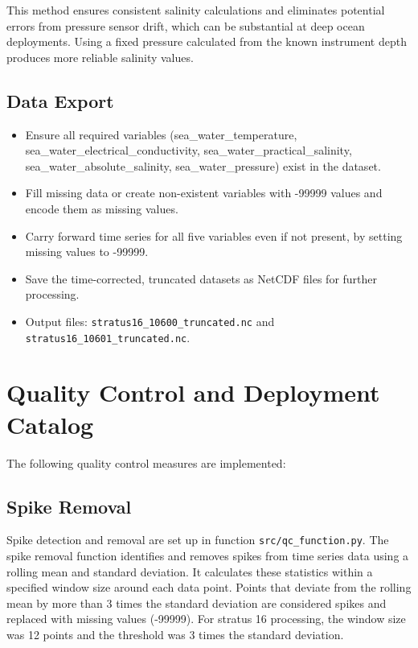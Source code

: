 \documentclass[11pt]{article}
\newcommand{\projectname}{stratus}  %
\newcommand{\casenumber}{16}  %
\newcommand{\FirstInstrument}{10600}
\newcommand{\SecondInstrument}{10601}
\newcommand{\WindowSize}{12}  %
\newcommand{\ThresholdValue}{3}  %
\begin{document}
This method ensures consistent salinity calculations and eliminates potential errors from pressure sensor drift, 
which can be substantial at deep ocean deployments. 
Using a fixed pressure calculated from the known instrument depth produces more reliable salinity values.

\subsection{Data Export}

\begin{itemize}
\item Ensure all required variables (sea\_water\_temperature, sea\_water\_electrical\_conductivity, sea\_water\_practical\_salinity, sea\_water\_absolute\_salinity, sea\_water\_pressure) exist in the dataset.
\item Fill missing data or create non-existent variables with -99999 values and encode them as missing values.
\item Carry forward time series for all five variables even if not present, by setting missing values to -99999.
\item Save the time-corrected, truncated datasets as NetCDF files for further processing.
\item Output files: 
\texttt{\projectname\casenumber\_\FirstInstrument\_truncated.nc}
and \texttt{\projectname\casenumber\_\SecondInstrument\_truncated.nc}.
\end{itemize}


\section{Quality Control and Deployment Catalog}
The following quality control measures are implemented:

\subsection{Spike Removal}
Spike detection and removal are set up in function \texttt{src/qc\_function.py}. 
The spike removal function identifies and removes spikes from time series data using a rolling mean and standard deviation. 
It calculates these statistics within a specified window size around each data point. 
Points that deviate from the rolling mean by more than \ThresholdValue{} times the standard deviation are considered spikes and replaced with missing values (-99999). 
For \projectname{} \casenumber{} processing, the window size was \WindowSize{} points and the threshold was \ThresholdValue{} times the standard deviation.
\end{document}
